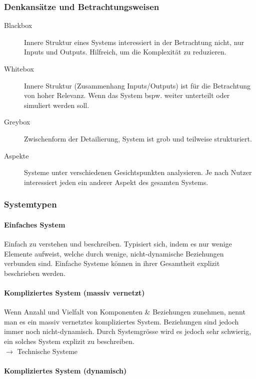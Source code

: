 \documentclass[a4paper]{article}
\begin{document}
		\subsubsection{Denkansätze und Betrachtungsweisen}
		
		\begin{description}
			\item[Blackbox] Innere Struktur eines Systems interessiert in der Betrachtung nicht, nur Inputs und Outputs.
			Hilfreich, um die Komplexität zu reduzieren.
			\item[Whitebox] Innere Struktur (Zusammenhang Inputs/Outputs) ist für die Betrachtung von hoher Relevanz.
			Wenn das System bspw. weiter unterteilt oder simuliert werden soll.
			\item[Greybox] Zwischenform der Detailierung, System ist grob und teilweise strukturiert.
			\item[Aspekte] Systeme unter verschiedenen Gesichtspunkten analysieren.
			Je nach Nutzer interessiert jeden ein anderer Aspekt des gesamten Systems.
		\end{description}
	
		\subsubsection{Systemtypen}
		
			\paragraph{Einfaches System}
			
			Einfach zu verstehen und beschreiben.
			Typisiert sich, indem es nur wenige Elemente aufweist, welche durch wenige, nicht-dynamische Beziehungen verbunden sind.
			Einfache Systeme können in ihrer Gesamtheit explizit beschrieben werden.
			
			\paragraph{Kompliziertes System (massiv vernetzt)}
			
			Wenn Anzahl und Vielfalt von Komponenten \& Beziehungen zunehmen, nennt man es ein massiv vernetztes kompliziertes System.
			Beziehungen sind jedoch immer noch nicht-dynamisch.
			Durch Systemgrösse wird es jedoch sehr schwierig, ein solches System explizit zu beschreiben.\\
			$\rightarrow$ Technische Systeme
			
			\paragraph{Kompliziertes System (dynamisch)}
			
\end{document}
